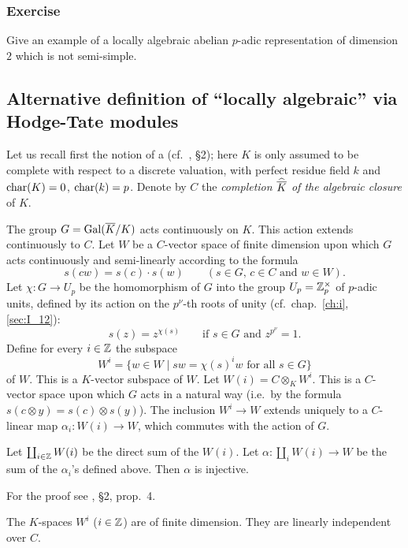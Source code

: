 \subsubsection*{Exercise}
Give an example of a locally algebraic abelian $p$-adic representation of
dimension $2$ which is not semi-simple.

\subsection{Alternative definition of ``locally algebraic'' via Hodge-Tate
modules}
\label{sec:III_12}
Let us recall first the notion of a  (cf.\ \cite{27},
\S 2); here $K$ is only assumed to be complete with respect to a discrete
valuation, with perfect residue field $k$ and $\operatorname{char}(K) = 0$, $\operatorname{char}(k) = p$.
Denote by $C$ the \emph{completion $\widehat{\overline{K}}$ of the algebraic
closure} of $K$.

The group $G = \operatorname{Gal}(\overline{K}/K)$ acts continuously on $K$. This action extends
continuously to $C$. Let $W$ be a $C$-vector space of finite dimension upon
which $G$ acts continuously and semi-linearly according to the formula
\[
	s(cw) = s(c) \cdot s(w) \qquad
	(s \in G, \, c \in C \text{ and } w \in W).
\]
Let $\chi\colon G \to U_p$ be the homomorphism of $G$ into the group $U_p =
\mathbb{Z}_p^\times$ of $p$-adic units, defined by its action on the $p^\nu$-th roots
of unity (cf.\ chap.~\ref{ch:i}, \ref{sec:I_12}):
\dpage
\[
	s(z) = z^{\chi(s)} \qquad \text{if } s \in G \text{ and } z^{p^\nu} = 1.
\]
Define for every $i \in \mathbb{Z}$ the subspace
\[
	W^i = \{ w \in W \mid sw = \chi(s)^i w \text{ for all } s\in G \}
\]
of $W$. This is a $K$-vector subspace of $W$. Let $W(i) = C \otimes_K W^i$.
This is a $C$-vector space upon which $G$ acts in a natural way (i.e.\ by the
formula $s(c \otimes y) = s(c) \otimes s(y)$). The inclusion $W^i \to W$
extends uniquely to a $C$-linear map $\alpha_i\colon W(i) \to W$, which
commutes with the action of $G$.

\begin{prop}[Tate]
	Let $\coprod_{i\in \mathbb{Z}} W(i)$ be the direct sum of the $W(i)$. Let
	$\alpha\colon \coprod_i W(i) \to W$ be the sum of the $\alpha_i$'s
	defined above. Then $\alpha$ is injective.
\end{prop}
For the proof see \cite{27}, \S 2, prop.~4.
\begin{corp}
	The $K$-spaces $W^i$ ($i \in \mathbb{Z}$) are of finite dimension.
	They are linearly independent over $C$.
\end{corp}

